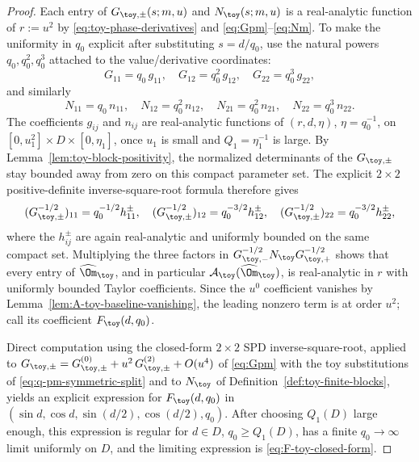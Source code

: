 \begin{proof}
Each entry of \(G_{\toy,\pm}(s;m,u)\) and \(N_\toy(s;m,u)\) is a
real-analytic function of \(r:=u^2\) by \eqref{eq:toy-phase-derivatives}
and \eqref{eq:Gpm}--\eqref{eq:Nm}.  To make the uniformity in \(q_0\)
explicit after substituting \(s=d/q_0\), use the natural powers
\(q_0,q_0^2,q_0^3\) attached to the value/derivative coordinates:
\[
G_{11}=q_0\,g_{11},\quad G_{12}=q_0^2\,g_{12},\quad
G_{22}=q_0^3\,g_{22},
\]
and similarly
\[
N_{11}=q_0\,n_{11},\quad N_{12}=q_0^2\,n_{12},\quad
N_{21}=q_0^2\,n_{21},\quad N_{22}=q_0^3\,n_{22}.
\]
The coefficients \(g_{ij}\) and \(n_{ij}\) are real-analytic functions
of \((r,d,\eta)\), \(\eta=q_0^{-1}\), on
\([0,u_1^2]\times D\times[0,\eta_1]\), once \(u_1\) is small and
\(Q_1=\eta_1^{-1}\) is large.  By Lemma~\ref{lem:toy-block-positivity},
the normalized determinants of the \(G_{\toy,\pm}\) stay bounded away
from zero on this compact parameter set.  The explicit \(2\times2\)
positive-definite inverse-square-root formula therefore gives
\[
(G_{\toy,\pm}^{-1/2})_{11}=q_0^{-1/2}h_{11}^{\pm},\quad
(G_{\toy,\pm}^{-1/2})_{12}=q_0^{-3/2}h_{12}^{\pm},\quad
(G_{\toy,\pm}^{-1/2})_{22}=q_0^{-3/2}h_{22}^{\pm},
\]
where the \(h_{ij}^{\pm}\) are again real-analytic and uniformly bounded
on the same compact set.  Multiplying the three factors in
\(G_{\toy,-}^{-1/2}N_\toy G_{\toy,+}^{-1/2}\) shows that every entry of
\(\widehat\Om_\toy\), and in particular
\(\mathcal A_\toy(\widehat\Om_\toy)\), is real-analytic in \(r\) with
uniformly bounded Taylor coefficients.  Since the \(u^0\) coefficient
vanishes by Lemma~\ref{lem:A-toy-baseline-vanishing}, the leading
nonzero term is at order \(u^2\); call its coefficient
\(F_\toy(d,q_0)\).

Direct computation using the closed-form \(2\times 2\) SPD
inverse-square-root, applied to
\(G_{\toy,\pm}=G_{\toy,\pm}^{(0)}+u^2\,G_{\toy,\pm}^{(2)}+O(u^4)\) of
\eqref{eq:Gpm} with the toy substitutions of
\eqref{eq:q-pm-symmetric-split} and to \(N_\toy\) of
Definition~\ref{def:toy-finite-blocks}, yields an explicit expression
for \(F_\toy(d,q_0)\) in
\((\sin d,\cos d,\sin(d/2),\cos(d/2),q_0)\).  After choosing
\(Q_1(D)\) large enough, this expression is regular for
\(d\in D\), \(q_0\ge Q_1(D)\), has a finite \(q_0\to\infty\) limit
uniformly on \(D\), and the limiting expression is
\eqref{eq:F-toy-closed-form}.


\end{proof}
